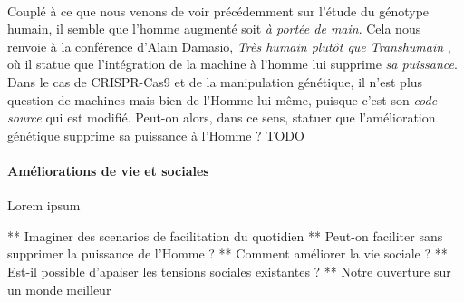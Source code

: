 \paragraph{} Couplé à ce que nous venons de voir précédemment sur l'étude du génotype humain, il semble que
l'homme augmenté soit \emph{à portée de main}. Cela nous renvoie à la conférence d'Alain Damasio, \emph{Très humain
plutôt que Transhumain} \cite{Damasio2}, où il statue que l'intégration de la machine à l'homme lui supprime \emph{
sa puissance}. Dans le cas de CRISPR-Cas9 et de la manipulation génétique, il n'est plus question de machines
mais bien de l'Homme lui-même, puisque c'est son \emph{code source} qui est modifié. Peut-on alors, dans ce sens,
statuer que l'amélioration génétique supprime sa puissance à l'Homme ? TODO

\paragraph{Améliorations de vie et sociales} Lorem ipsum

** Imaginer des scenarios de facilitation du quotidien
** Peut-on faciliter sans supprimer la puissance de l'Homme ?
** Comment améliorer la vie sociale ?
** Est-il possible d'apaiser les tensions sociales existantes ?
** Notre ouverture sur un monde meilleur